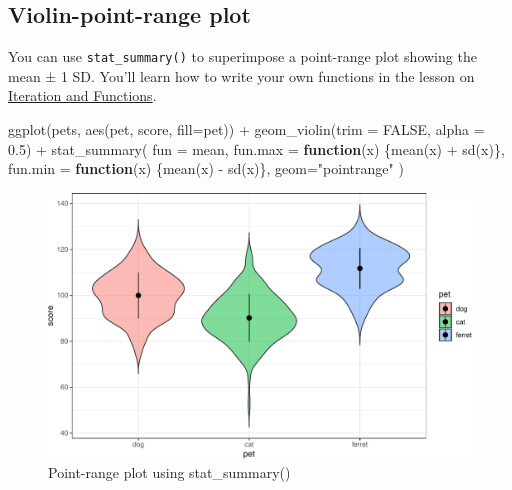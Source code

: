 \documentclass[
  oneside]{book}
\newenvironment{Shaded}{\begin{snugshade}}{\end{snugshade}}
\newcommand{\AttributeTok}[1]{\textcolor[rgb]{0.77,0.63,0.00}{#1}}
\newcommand{\ConstantTok}[1]{\textcolor[rgb]{0.00,0.00,0.00}{#1}}
\newcommand{\ControlFlowTok}[1]{\textcolor[rgb]{0.13,0.29,0.53}{\textbf{#1}}}
\newcommand{\FloatTok}[1]{\textcolor[rgb]{0.00,0.00,0.81}{#1}}
\newcommand{\FunctionTok}[1]{\textcolor[rgb]{0.00,0.00,0.00}{#1}}
\newcommand{\NormalTok}[1]{#1}
\newcommand{\SpecialCharTok}[1]{\textcolor[rgb]{0.00,0.00,0.00}{#1}}
\newcommand{\StringTok}[1]{\textcolor[rgb]{0.31,0.60,0.02}{#1}}
\begin{document}
\hypertarget{violin-point-range-plot}{%
\subsection{Violin-point-range plot}\label{violin-point-range-plot}}

You can use \texttt{stat\_summary()} to superimpose a point-range plot showing the mean ± 1 SD. You'll learn how to write your own functions in the lesson on \protect\hyperlink{func}{Iteration and Functions}.

\begin{Shaded}
\begin{Highlighting}[]
\FunctionTok{ggplot}\NormalTok{(pets, }\FunctionTok{aes}\NormalTok{(pet, score, }\AttributeTok{fill=}\NormalTok{pet)) }\SpecialCharTok{+}
  \FunctionTok{geom\_violin}\NormalTok{(}\AttributeTok{trim =} \ConstantTok{FALSE}\NormalTok{, }\AttributeTok{alpha =} \FloatTok{0.5}\NormalTok{) }\SpecialCharTok{+}
  \FunctionTok{stat\_summary}\NormalTok{(}
    \AttributeTok{fun =}\NormalTok{ mean,}
    \AttributeTok{fun.max =} \ControlFlowTok{function}\NormalTok{(x) \{}\FunctionTok{mean}\NormalTok{(x) }\SpecialCharTok{+} \FunctionTok{sd}\NormalTok{(x)\},}
    \AttributeTok{fun.min =} \ControlFlowTok{function}\NormalTok{(x) \{}\FunctionTok{mean}\NormalTok{(x) }\SpecialCharTok{{-}} \FunctionTok{sd}\NormalTok{(x)\},}
    \AttributeTok{geom=}\StringTok{"pointrange"}
\NormalTok{  )}
\end{Highlighting}
\end{Shaded}

\begin{figure}

{\centering \includegraphics[width=0.9\linewidth]{images/stat-summary-1} 

}

\caption{Point-range plot using stat_summary()}\label{fig:stat-summary}
\end{figure}
\end{document}
